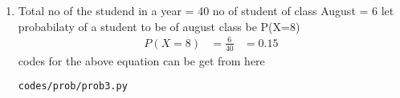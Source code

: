 \renewcommand{\theequation}{\theenumi}
\begin{enumerate}[label=\arabic*.,ref=\thesubsection.\theenumi]
\item Total no of the studend in a year = 40
no of student of class August  = 6
let probabilaty of a student to be of august class  be P(X=8)
\begin{align}
P(X=8) &= \frac{6}{40}
&=0.15
\end{align}
codes for the above equation can be get from here
\begin{lstlisting}
codes/prob/prob3.py
\end{lstlisting}
\end{enumerate}